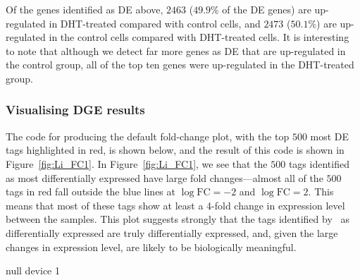 Of the genes identified as DE above, $2463$ ($49.9$\% of the DE genes) are
up-regulated in DHT-treated compared with control cells, and $2473$
($50.1$\%) are up-regulated in the control cells compared with DHT-treated
cells. It is interesting to note that although we detect far more
genes as DE that are up-regulated in the control group, all of the top
ten genes were up-regulated in the DHT-treated group.


\subsubsection{Visualising DGE results}
The code for producing the default fold-change plot, with the top
$500$ most DE tags highlighted in red, is shown below, and the result
of this code is shown in Figure~\ref{fig:Li_FC1}. In
Figure~\ref{fig:Li_FC1}, we see that the $500$ tags identified as most
differentially expressed have large fold changes---almost all of the
$500$ tags in red fall outside the blue lines at $\log \textrm{FC} =
-2$ and $\log \textrm{FC} = 2$. This means that most of these tags
show at least a 4-fold change in expression level between the
samples. This plot suggests strongly that the tags identified by
\edgeR~as differentially expressed are truly differentially expressed,
and, given the large changes in expression level, are likely to be
biologically meaningful.

\begin{Schunk}
\begin{Soutput}
null device 
          1 
\end{Soutput}
\end{Schunk}

